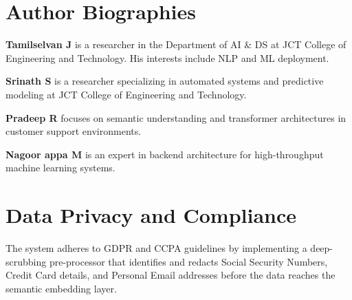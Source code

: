 \documentclass[conference]{IEEEtran}
\begin{document}
\section{Author Biographies}
\textbf{Tamilselvan J} is a researcher in the Department of AI \& DS at JCT College of Engineering and Technology. His interests include NLP and ML deployment.

\textbf{Srinath S} is a researcher specializing in automated systems and predictive modeling at JCT College of Engineering and Technology.

\textbf{Pradeep R} focuses on semantic understanding and transformer architectures in customer support environments.

\textbf{Nagoor appa M} is an expert in backend architecture for high-throughput machine learning systems.

\section{Data Privacy and Compliance}
The system adheres to GDPR and CCPA guidelines by implementing a deep-scrubbing pre-processor that identifies and redacts Social Security Numbers, Credit Card details, and Personal Email addresses before the data reaches the semantic embedding layer. 
\end{document}

